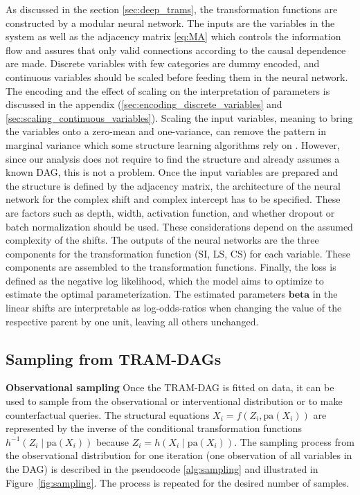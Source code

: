 As discussed in the section \ref{sec:deep_trams}, the transformation functions are constructed by a modular neural network. The inputs are the variables in the system as well as the adjacency matrix \ref{eq:MA} which controls the information flow and assures that only valid connections according to the causal dependence are made. Discrete variables with few categories are dummy encoded, and continuous variables should be scaled before feeding them in the neural network. The encoding and the effect of scaling on the interpretation of parameters is discussed in the appendix (\ref{sec:encoding_discrete_variables} and  \ref{sec:scaling_continuous_variables}). Scaling the input variables, meaning to bring the variables onto a zero-mean and one-variance, can remove the pattern in marginal variance which some structure learning algorithms rely on \citep{reisach2021}. However, since our analysis does not require to find the structure and already assumes a known DAG, this is not a problem. 
Once the input variables are prepared and the structure is defined by the adjacency matrix, the architecture of the neural network for the complex shift and complex intercept has to be specified. These are factors such as depth, width, activation function, and whether dropout or batch normalization should be used. These considerations depend on the assumed complexity of the shifts. The outputs of the neural networks are the three components for the transformation function (SI, LS, CS) for each variable. These components are assembled to the transformation functions. Finally, the loss is defined as the negative log likelihood, which the model aims to optimize to estimate the optimal parameterization. The estimated parameters $\boldsymbol{beta}$ in the linear shifts are interpretable as log-odds-ratios when changing the value of the respective parent by one unit, leaving all others unchanged. 




\subsection{Sampling from TRAM-DAGs} \label{methods:sampling}

\textbf{Observational sampling} Once the TRAM-DAG is fitted on data, it can be used to sample from the observational or interventional distribution or to make counterfactual queries. 
The structural equations $X_i = f(Z_i, \text{pa}(X_i))$ are represented by the inverse of the conditional transformation functions $h^{-1}(Z_i \mid \text{pa}(X_i))$ because $Z_i = h(X_i \mid \text{pa}(X_i))$. The sampling process from the observational distribution for one iteration (one observation of all variables in the DAG) is described in the pseudocode \ref{alg:sampling} and illustrated in Figure~\ref{fig:sampling}. The process is repeated for the desired number of samples. 

